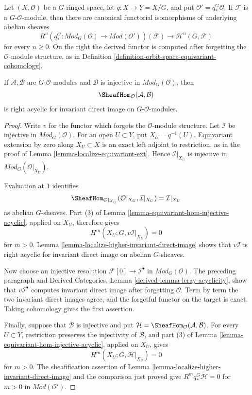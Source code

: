 \begin{lemma}
\label{lemma-equivariant-higher-invariant-direct-image-modules}
\begin{reference}
\cite[Chapter V, \S 5.6, proof of Lemma 5.6.1 and the following
discussion, p. 215]{Tohoku}
\end{reference}
Let $(X,\mathcal O)$ be a $G$-ringed space, let $q:X\to Y=X/G$, and put
$\mathcal O'=q_*^G\mathcal O$. If $\mathcal F$ is a
$G$-$\mathcal O$-module, then there are canonical functorial isomorphisms
of underlying abelian sheaves
$$
R^n\left(q_*^G:\textit{Mod}_G(\mathcal O)
\longrightarrow\textit{Mod}(\mathcal O')\right)(\mathcal F)
\longrightarrow
\mathcal H^n(G,\mathcal F)
$$
for every $n\geq 0$. On the right the derived functor is computed after
forgetting the $\mathcal O$-module structure, as in Definition
\ref{definition-orbit-space-equivariant-cohomology}.

If $\mathcal A,\mathcal B$ are $G$-$\mathcal O$-modules and $\mathcal B$
is injective in $\textit{Mod}_G(\mathcal O)$, then
$$
\SheafHom_{\mathcal O}(\mathcal A,\mathcal B)
$$
is right acyclic for invariant direct image on $G$-$\mathcal O$-modules.
\end{lemma}

\begin{proof}
Write $v$ for the functor which forgets the $\mathcal O$-module structure.
Let $\mathcal I$ be injective in $\textit{Mod}_G(\mathcal O)$. For an open
$U\subset Y$, put $X_U=q^{-1}(U)$. Equivariant extension by zero along
$X_U\subset X$ is an exact left adjoint to restriction, as in the proof of
Lemma \ref{lemma-localize-equivariant-ext}. Hence
$\mathcal I|_{X_U}$ is injective in
$\textit{Mod}_G(\mathcal O|_{X_U})$.

Evaluation at $1$ identifies
$$
\SheafHom_{\mathcal O|_{X_U}}
(\mathcal O|_{X_U},\mathcal I|_{X_U})
=
\mathcal I|_{X_U}
$$
as abelian $G$-sheaves. Part (3) of Lemma
\ref{lemma-equivariant-hom-injective-acyclic}, applied on $X_U$, therefore
gives
$$
H^m(X_U;G,v\mathcal I|_{X_U})=0
$$
for $m>0$. Lemma \ref{lemma-localize-higher-invariant-direct-image}
shows that $v\mathcal I$ is right acyclic for invariant direct image on
abelian $G$-sheaves.

Now choose an injective resolution
$\mathcal F[0]\to\mathcal I^\bullet$ in
$\textit{Mod}_G(\mathcal O)$. The preceding paragraph and Derived
Categories, Lemma \ref{derived-lemma-leray-acyclicity}, show that
$v\mathcal I^\bullet$ computes invariant direct image after forgetting
$\mathcal O$. Term by term the two invariant direct images agree, and the
forgetful functor on the target is exact. Taking cohomology gives the first
assertion.

Finally, suppose that $\mathcal B$ is injective and put
$\mathcal H=\SheafHom_{\mathcal O}(\mathcal A,\mathcal B)$. For every
$U\subset Y$, restriction preserves the injectivity of $\mathcal B$, and
part (3) of Lemma \ref{lemma-equivariant-hom-injective-acyclic}, applied on
$X_U$, gives
$$
H^m(X_U;G,\mathcal H|_{X_U})=0
$$
for $m>0$. The sheafification assertion of Lemma
\ref{lemma-localize-higher-invariant-direct-image} and the comparison just
proved give $R^mq_*^G\mathcal H=0$ for $m>0$ in
$\textit{Mod}(\mathcal O')$.
\end{proof}


